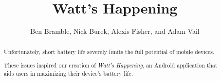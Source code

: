 \documentclass[11pt,pdftex,twocolumn]{article}
\title{Watt's Happening}
\author{Ben Bramble, Nick Burek, Alexis Fisher, and Adam Vail}
\begin{document}
\maketitle

\begin{abstract}
Unfortunately, short battery life severely limits the full potential of mobile devices.

These issues inspired our creation of \emph{Watt's Happening}, an Android application that aids users in maximizing their device's battery life.

\end{abstract}









{\footnotesize 
}
\end{document}
